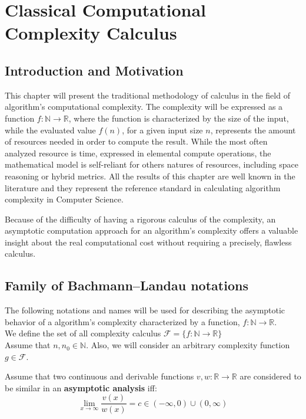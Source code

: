 

\chapter{Classical Computational Complexity Calculus }


\section{Introduction and Motivation}
This chapter will present the traditional methodology of calculus in the field of algorithm's computational complexity. The complexity will be expressed as a function $f:\mathbb{N}\longrightarrow\mathbb{R}$, where the function is characterized by the size of the input, while the evaluated value $f(n)$, for a given input size $n$, represents the amount of resources needed in order to compute the result. While the most often analyzed resource is time, expressed in elemental compute operations, the mathematical model is self-reliant for others natures of resources, including space reasoning or hybrid metrics. All the results of this chapter are well known in the literature and they represent the reference standard in calculating algorithm complexity in Computer Science. 

Because of the difficulty of having a rigorous calculus of the complexity, an asymptotic computation approach for an algorithm's complexity offers a valuable insight about the real computational cost without requiring a precisely, flawless calculus.



\section{Family of Bachmann–Landau notations}
The following notations and names will be used for describing the asymptotic behavior of a algorithm's complexity characterized by a function, $f:\mathbb{N}\longrightarrow\mathbb{R}$. \\
We define the set of all complexity calculus $\mathcal{F}= \lbrace f:\mathbb{N}\longrightarrow\mathbb{R} \rbrace$
\\Assume that $n, n_{0}\in\mathbb{N}$. Also, we will consider an arbitrary complexity function $g \in \mathcal{F}$. \\

\begin{definition}
Assume that two continuous and derivable functions $v,w:\mathbb{R}\longrightarrow\mathbb{R}$ are considered to be similar in an \textbf{asymptotic analysis} iff: 
  \[\lim_{x\to\infty} \frac{v(x)}{w(x)} = c \in (-\infty, 0) \cup (0,\infty) \]
\end{definition}

